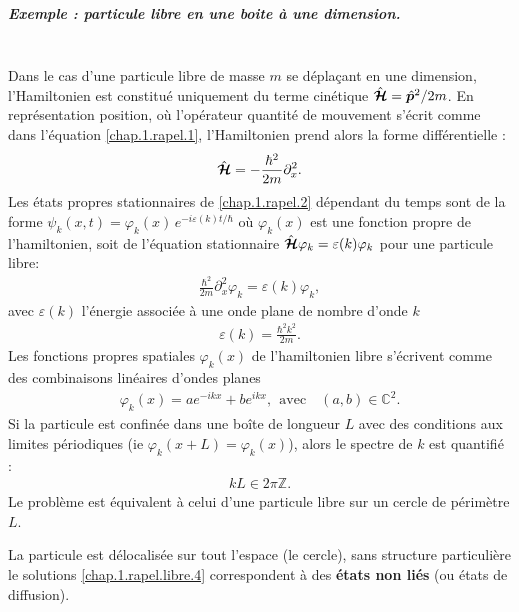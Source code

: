 \begin{mdframed}[
	linewidth=0.5pt, 
	backgroundcolor=gray!5, 
	roundcorner=50pt,	
	innerleftmargin=5pt,
    innerrightmargin=5pt,
    innertopmargin=-10pt,
    innerbottommargin=2pt,
    leftmargin=2pt,
    rightmargin=2pt
	]
\subparagraph{Exemple : particule libre en une boite à une dimension.} 
	{~}\\
	
	Dans le cas d’une particule libre de masse $m$ se déplaçant en une dimension, l’Hamiltonien est constitué uniquement du terme cinétique $\hat{\bm{\mathcal{H}}} = \hat{\bm{p}}^2 / 2m$. En représentation position, où l’opérateur quantité de mouvement s’écrit comme dans l’équation \eqref{chap.1.rapel.1}, l’Hamiltonien prend alors la forme différentielle :
	\begin{eqnarray}
		\hat{\bm{\mathcal{H}}} = -\frac{\hbar^2}{2m} \partial_x^2.\label{chap.1.rapel.libre.1}
	\end{eqnarray}
	Les états propres stationnaires de \eqref{chap.1.rapel.2} dépendant du temps sont de la forme $\psi_k(x,t) = \varphi_k(x)\,e^{-i\varepsilon(k)t/\hbar}$ où $\varphi_k(x)$ est une fonction propre de l’hamiltonien,  soit de  l’équation stationnaire  $\hat{\bm{\mathcal{H}}}\varphi_k = \varepsilon(k)\varphi_k$ \ie pour une particule libre:
	\begin{eqnarray}
		\frac{\hbar^2}{2m} \partial_x^2 \varphi_k = \varepsilon(k) \varphi_k,\label{chap.1.rapel.libre.2}
	\end{eqnarray}
	avec $\varepsilon(k)$ l’énergie associée à une onde plane de nombre d’onde $k$
	\begin{eqnarray}
		\varepsilon(k) = \frac{\hbar^2 k^2 }{2 m}\label{chap.1.rapel.libre.3}.
	\end{eqnarray}
	Les fonctions propres spatiales $\varphi_k(x)$ de l’hamiltonien libre s’écrivent comme des combinaisons linéaires d’ondes planes  
	\begin{eqnarray}
		\varphi_k(x) = a e^{-i k x} + b e^{i k x},~~ \mbox{avec}\quad  (a,b) \in \mathbb{C}^2\label{chap.1.rapel.libre.4}.
	\end{eqnarray}
	Si la particule est confinée dans une boîte de longueur $L$ avec des conditions aux limites périodiques (ie $\varphi_k(x+L) = \varphi_k(x)$), alors le spectre de $k$ est quantifié : 
	\begin{eqnarray}
		kL \in 2\pi\mathbb{Z}\label{chap.1.rapel.libre.5}.
	\end{eqnarray}
	Le problème est équivalent à celui d’une particule libre sur un cercle de périmètre $L$.\\
	
	\medskip
	
	La particule est délocalisée sur tout l’espace (le cercle), sans structure particulière \ie le solutions \eqref{chap.1.rapel.libre.4} correspondent à des {\bf états non liés} (ou états de diffusion).

\end{mdframed}

